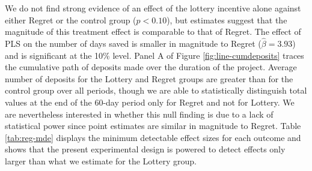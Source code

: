 \documentclass[11pt]{article}
\begin{document}
		We do not find strong evidence of an effect of the lottery incentive alone against either Regret or the control group ($p < 0.10$), but estimates suggest that the magnitude of this treatment effect is comparable to that of Regret. The effect of PLS on the number of days saved is smaller in magnitude to Regret ($\hat \beta = 3.93$) and is significant at the 10\% level. Panel A of Figure \ref{fig:line-cumdeposits} traces the cumulative path of deposits made over the duration of the project. Average number of deposits for the Lottery and Regret groups are greater than for the control group over all periods, though we are able to statistically distinguish total values at the end of the 60-day period only for Regret and not for Lottery. We are nevertheless interested in whether this null finding is due to a lack of statistical power since point estimates are similar in magnitude to Regret. Table \ref{tab:reg-mde} displays the minimum detectable effect sizes for each outcome and shows that the present experimental design is powered to detect effects only larger than what we estimate for the Lottery group.

		
\end{document}
